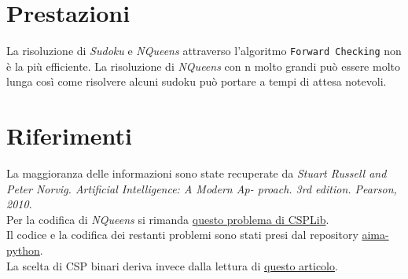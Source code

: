\documentclass[11pt]{article}
\begin{document}
\section{Prestazioni}
La risoluzione di \textit{Sudoku} e \textit{NQueens} attraverso l’algoritmo \texttt{Forward Checking} non è la più efficiente. 
La risoluzione di \textit{NQueens} con n molto grandi può essere molto lunga così come risolvere alcuni sudoku può portare a tempi di attesa notevoli.
\section{Riferimenti}
La maggioranza delle informazioni sono state recuperate da \textit{Stuart Russell and Peter Norvig. Artificial Intelligence: A Modern Ap-
proach. 3rd edition. Pearson, 2010}.\\Per la codifica di \textit{NQueens} si rimanda \href{http://www.csplib.org/Problems/prob054/}{questo problema di CSPLib}.\\Il codice e la codifica dei restanti problemi sono stati presi dal repository \href{https://github.com/aimacode/aima-python}{aima-python}.\\La scelta di CSP binari deriva invece dalla lettura di \href{https://arxiv.org/pdf/1109.5714.pdf}{questo articolo}.
\end{document}
